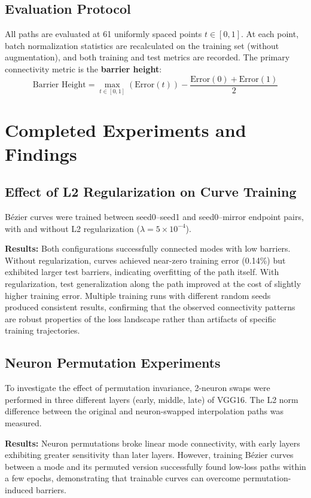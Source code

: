 \documentclass[11pt,a4paper]{article}
\begin{document}
\subsection{Evaluation Protocol}

All paths are evaluated at 61 uniformly spaced points $t \in [0, 1]$. At each point, batch normalization statistics are recalculated on the training set (without augmentation), and both training and test metrics are recorded. The primary connectivity metric is the \textbf{barrier height}:
$$\text{Barrier Height} = \max_{t \in [0,1]}(\text{Error}(t)) - \frac{\text{Error}(0) + \text{Error}(1)}{2}$$

\section{Completed Experiments and Findings}

\subsection{Effect of L2 Regularization on Curve Training}

B\'{e}zier curves were trained between seed0--seed1 and seed0--mirror endpoint pairs, with and without L2 regularization ($\lambda = 5 \times 10^{-4}$).

\textbf{Results:} Both configurations successfully connected modes with low barriers. Without regularization, curves achieved near-zero training error (0.14\%) but exhibited larger test barriers, indicating overfitting of the path itself. With regularization, test generalization along the path improved at the cost of slightly higher training error. Multiple training runs with different random seeds produced consistent results, confirming that the observed connectivity patterns are robust properties of the loss landscape rather than artifacts of specific training trajectories.

\subsection{Neuron Permutation Experiments}

To investigate the effect of permutation invariance, 2-neuron swaps were performed in three different layers (early, middle, late) of VGG16. The L2 norm difference between the original and neuron-swapped interpolation paths was measured.

\textbf{Results:} Neuron permutations broke linear mode connectivity, with early layers exhibiting greater sensitivity than later layers. However, training B\'{e}zier curves between a mode and its permuted version successfully found low-loss paths within a few epochs, demonstrating that trainable curves can overcome permutation-induced barriers.
\end{document}
